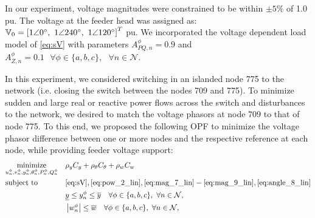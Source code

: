 In our experiment, voltage magnitudes were constrained to be within $\pm 5\%$ of 1.0 pu. The voltage at the feeder head was assigned as: 
$\mathbb{V}_{0} = {\left[ 1\angle 0\degree, \text{ } 1\angle 240\degree , \text{ } 1\angle 120\degree \right]}^{T}$
pu. We incorporated the voltage dependent load model of \eqref{eq:sV} with parameters $A_{PQ,n}^{\phi} = 0.9$ and $A_{Z,n}^{\phi} = 0.1 \text{ } \forall \phi \in \{ a,b,c \}, \text{ } \forall n \in \mathcal{N}$.

In this experiment, we considered switching in an islanded node 775 to the network (i.e. closing the switch between the nodes 709 and 775). To minimize sudden and large real or reactive power flows across the switch and disturbances to the network, we desired to match the voltage phasors at node 709 to that of node 775. To this end, we proposed the following OPF to minimize the voltage phasor difference between one or more nodes and the respective reference at each node, while providing feeder voltage support:
\begin{equation}
\begin{aligned}
  & \underset{u_{n}^{\phi}, v_{n}^{\phi}, y_{n}^{\phi}, \theta_{n}^{\phi}, P_{n}^{\phi}, Q_{n}^{\phi}} {\text{minimize}}
  & & \rho_{y} C_{y} + \rho_{\theta} C_{\theta} + \rho_{w} C_{w} \\
  & \text{subject to}
  & & \eqref{eq:sV}, \eqref{eq:pow_2_lin}, \eqref{eq:mag_7_lin} - \eqref{eq:mag_9_lin}, \eqref{eq:angle_8_lin} \\
  & & & \underline{y} \le y_{n}^{\phi} \le \overline{y} \quad \forall \phi \in \{ a,b,c \}, \text{ } \forall n \in \mathcal{N}, \\
  & & & \left| w_{n}^{\phi} \right| \le \overline{w} \quad \forall \phi \in \{ a,b,c \}, \text{ } \forall n \in \mathcal{N},
\end{aligned}
\label{eq:OPF}
\end{equation}

